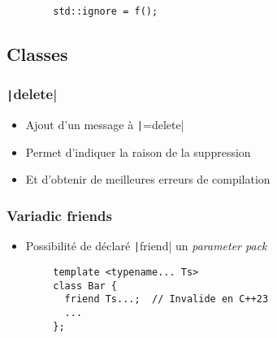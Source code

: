 \documentclass[C++.tex]{subfiles}
\begin{document}
\begin{frame}[fragile]
	\begin{verbatim}
		std::ignore = f();
	\end{verbatim}


\end{frame}

\subsection*{Classes}
\begin{frame}[fragile]
	\frametitle{\texttt|delete|}
	\begin{itemize}
		\item Ajout d'un message à \texttt|=delete|
		\item Permet d'indiquer la raison de la suppression
		\item Et d'obtenir de meilleures erreurs de compilation
	\end{itemize}

\end{frame}

\begin{frame}[fragile]
	\frametitle{Variadic friends}
	\begin{itemize}
		\item Possibilité de déclaré \texttt|friend| un \textit{parameter pack}
	\end{itemize}

	\begin{verbatim}
		template <typename... Ts>
		class Bar {
		  friend Ts...;  // Invalide en C++23
		  ...
		};
	\end{verbatim}

\end{frame}
\end{document}
